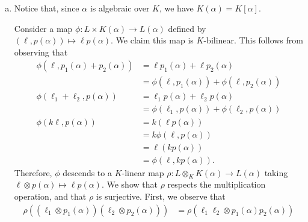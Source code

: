 \documentclass[10pt]{mypackage}
\begin{document}
\begin{solution}\hfill
  \begin{enumerate}[(a)]
    \item Notice that, since $\alpha$ is algebraic over $K$, we have $K(\alpha) = K\left[ \alpha \right]$.

      Consider a map $\phi\colon L\times K\left( \alpha \right)\rightarrow L\left( \alpha \right)$ defined by $\left( \ell,p(\alpha) \right)\mapsto \ell p(\alpha)$. We claim this map is $K$-bilinear. This follows from observing that
      \begin{align*}
        \phi\left( \ell,p_1\left( \alpha \right) + p_2\left( \alpha \right) \right) &= \ell p_1\left( \alpha \right) + \ell p_2\left( \alpha \right)\\
                                                                                    &= \phi\left( \ell,p_1(\alpha) \right) + \phi\left( \ell,p_2\left( \alpha \right) \right)\\
        \phi\left( \ell_1 + \ell_2,p\left( \alpha \right) \right) &= \ell_1 p\left( \alpha \right) + \ell_2 p\left( \alpha \right)\\
                                                                  &= \phi\left( \ell_1,p\left( \alpha \right) \right) + \phi\left( \ell_2,p\left( \alpha \right) \right)\\
        \phi\left( k\ell,p\left( \alpha \right) \right) &= k \left( \ell p\left( \alpha \right) \right)\\
                                                        &= k \phi\left( \ell,p\left( \alpha \right) \right)\\
                                                        &= \ell \left( kp\left( \alpha \right) \right)\\
                                                        &= \phi\left( \ell,kp\left( \alpha \right) \right).
      \end{align*}
      Therefore, $\phi$ descends to a $K$-linear map $\rho\colon L\otimes_{K}K\left( \alpha \right)\rightarrow L\left( \alpha \right)$ taking $\ell\otimes p\left( \alpha \right)\mapsto \ell p\left( \alpha \right)$. We show that $\rho$ respects the multiplication operation, and that $\rho$ is surjective. First, we observe that
      \begin{align*}
        \rho\left( \left( \ell_1\otimes p_1\left( \alpha \right) \right)\left( \ell_2\otimes p_2\left( \alpha \right) \right) \right) &= \rho\left( \ell_1\ell_2\otimes p_1(\alpha)p_2(\alpha) \right)\\

\end{align*}
\end{enumerate}
\end{solution}
\end{document}

